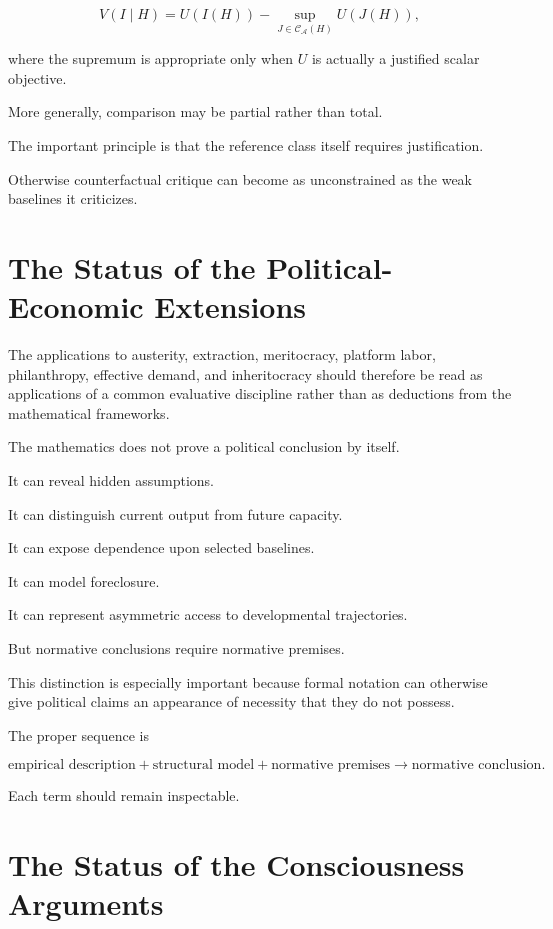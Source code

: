 \documentclass[11pt]{article}
\theoremstyle{remark}
\newcommand{\Adm}{\mathcal{A}}
\begin{document}
\begin{equation}
V(I\mid H)
=
U(I(H))
-
\sup_{J\in\mathcal{C}_{\Adm}(H)}
U(J(H)),
\end{equation}

where the supremum is appropriate only when $U$ is actually a justified scalar
objective.

More generally, comparison may be partial rather than total.

The important principle is that the reference class itself requires
justification.

Otherwise counterfactual critique can become as unconstrained as the weak
baselines it criticizes.

\section{The Status of the Political-Economic Extensions}

The applications to austerity, extraction, meritocracy, platform labor,
philanthropy, effective demand, and inheritocracy should therefore be read as
applications of a common evaluative discipline rather than as deductions from
the mathematical frameworks.

The mathematics does not prove a political conclusion by itself.

It can reveal hidden assumptions.

It can distinguish current output from future capacity.

It can expose dependence upon selected baselines.

It can model foreclosure.

It can represent asymmetric access to developmental trajectories.

But normative conclusions require normative premises.

This distinction is especially important because formal notation can otherwise
give political claims an appearance of necessity that they do not possess.

The proper sequence is

\begin{equation}
\text{empirical description}
+
\text{structural model}
+
\text{normative premises}
\rightarrow
\text{normative conclusion}.
\end{equation}

Each term should remain inspectable.

\section{The Status of the Consciousness Arguments}
\end{document}
